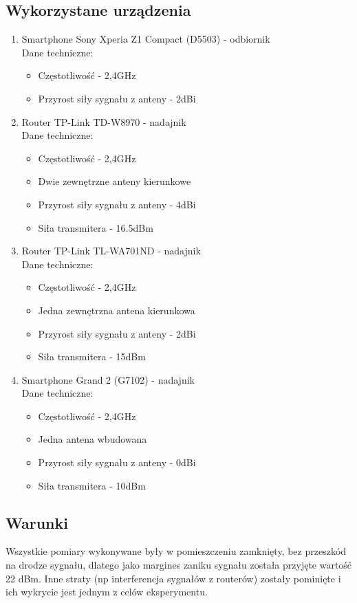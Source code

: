 \documentclass{article}
\begin{document}
		\subsection{Wykorzystane urządzenia}
			\begin{enumerate}
				\item Smartphone Sony Xperia Z1 Compact (D5503) - odbiornik\\				
					Dane techniczne:
					\begin{itemize}
						\item Częstotliwość - 2,4GHz
						\item Przyrost siły sygnału z anteny - 2dBi
					\end{itemize}
				\item Router TP-Link TD-W8970 - nadajnik\\
				Dane techniczne:
				\begin{itemize}
					\item Częstotliwość - 2,4GHz
					\item Dwie zewnętrzne anteny kierunkowe
					\item Przyrost siły sygnału z anteny - 4dBi
					\item Siła transmitera - 16.5dBm					
				\end{itemize}
				\item Router TP-Link TL-WA701ND - nadajnik\\
				Dane techniczne:
				\begin{itemize}
					\item Częstotliwość - 2,4GHz
					\item Jedna zewnętrzna antena kierunkowa
					\item Przyrost siły sygnału z anteny - 2dBi
					\item Siła transmitera - 15dBm					
				\end{itemize}
				\item Smartphone Grand 2 (G7102) - nadajnik\\
				Dane techniczne:
				\begin{itemize}
					\item Częstotliwość - 2,4GHz
					\item Jedna antena wbudowana
					\item Przyrost siły sygnału z anteny - 0dBi
					\item Siła transmitera - 10dBm					
				\end{itemize}
			\end{enumerate}
		\subsection{Warunki}
			Wszystkie pomiary wykonywane były w pomieszczeniu zamknięty, bez przeszkód na drodze sygnału, dlatego jako margines zaniku sygnału została przyjęte wartość 22 dBm. Inne straty (np interferencja sygnałów z routerów) zostały pominięte i ich wykrycie jest jednym z celów eksperymentu.
\end{document}
